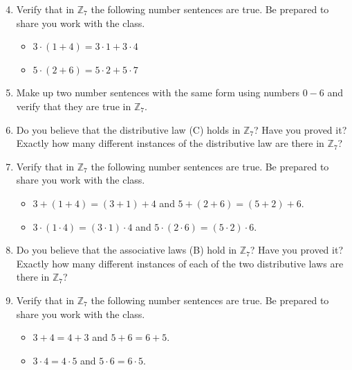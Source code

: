 \documentclass[11pt]{article}
\theoremstyle{definition}
\begin{document}
    \begin{enumerate}
        \setcounter{enumi}{3}
      \item Verify that in $\mathbb{Z}_7$ the following number sentences are true. Be prepared to share you work with the class.
        \begin{itemize}
          \item $3\cdot (1+4) = 3\cdot 1 + 3 \cdot 4$
          \item $5\cdot (2 + 6) = 5\cdot 2 + 5 \cdot 7$
        \end{itemize}
      \item Make up two number sentences with the same form using numbers $0-6$ and verify that they are true in $\mathbb{Z}_7$.

        \vspace{1.5in}

      \item Do you believe that the distributive law (C) holds in $\mathbb{Z}_7$? Have you proved it? Exactly how many different 
        instances of the distributive law are there in $\mathbb{Z}_7$?

        \vspace{1.5in}

      \item Verify that in $\mathbb{Z}_7$ the following number sentences are true. Be prepared to share you work with the class.
        \begin{itemize}
          \item $3 + (1+4) = (3+1)+4$ and $5 + (2 + 6) = (5 + 2) + 6$.
          \item $3 \cdot (1\cdot 4) = (3\cdot 1)\cdot 4$ and $5 \cdot (2 \cdot 6) = (5 \cdot 2) \cdot 6$.
        \end{itemize}

        \vspace{1.5in}

      \item Do you believe that the associative laws (B) hold in $\mathbb{Z}_7$? Have you proved it? Exactly how many different 
        instances of each of the two distributive laws are there in $\mathbb{Z}_7$?

        \vspace{1.5in}

      \item Verify that in $\mathbb{Z}_7$ the following number sentences are true. Be prepared to share you work with the class.
        \begin{itemize}
          \item $3 +4 = 4+3$ and $5 + 6 = 6+ 5$.
          \item $3 \cdot 4 = 4\cdot 5$ and $5 \cdot 6 = 6 \cdot 5$.
        \end{itemize}


\end{enumerate}
\end{document}
